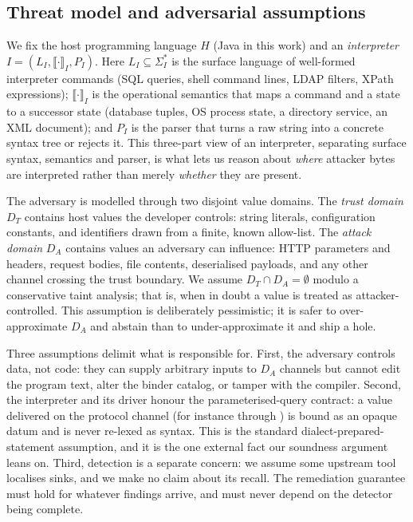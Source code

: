 \subsection{Threat model and adversarial assumptions}
\label{sec:threat}

We fix the host programming language $H$ (Java in this work) and
an \emph{interpreter} $I=(L_I,\llbracket\cdot\rrbracket_I,P_I)$. Here $L_I
\subseteq \Sigma_I^{*}$ is the surface language of well-formed interpreter
commands (SQL queries, shell command lines, LDAP filters, XPath
expressions); $\llbracket\cdot\rrbracket_I$ is the operational semantics
that maps a command and a state to a successor state (database tuples, OS
process state, a directory service, an XML document); and $P_I$ is the
parser that turns a raw string into a concrete syntax tree or rejects it.
This three-part view of an interpreter, separating surface syntax,
semantics and parser, is what lets us reason about \emph{where} attacker
bytes are interpreted rather than merely \emph{whether} they are present.

The adversary is modelled through two disjoint value domains. The
\emph{trust domain} $D_T$ contains host values the developer controls:
string literals, configuration constants, and identifiers drawn from a
finite, known allow-list. The \emph{attack domain} $D_A$ contains values an
adversary can influence: HTTP parameters and headers, request bodies, file
contents, deserialised payloads, and any other channel crossing the trust
boundary. We assume $D_T \cap D_A = \emptyset$ modulo a conservative taint
analysis; that is, when in doubt a value is treated as attacker-controlled.
This assumption is deliberately pessimistic; it is safer to over-approximate
$D_A$ and abstain than to under-approximate it and ship a hole.

Three assumptions delimit what \irsam{} is responsible for. First, the
adversary controls data, not code: they can supply arbitrary inputs to
$D_A$ channels but cannot edit the program text, alter the binder catalog,
or tamper with the compiler. Second, the interpreter and its driver honour
the parameterised-query contract: a value delivered on the protocol channel
(for instance through ) is bound as an
opaque datum and is never re-lexed as syntax. This is the standard
dialect-prepared-statement assumption, and it is the one external fact our
soundness argument leans on. Third, detection is a separate concern: we
assume some upstream tool localises sinks, and we make no claim about its
recall. The remediation guarantee must hold for whatever findings arrive,
and must never depend on the detector being complete.

